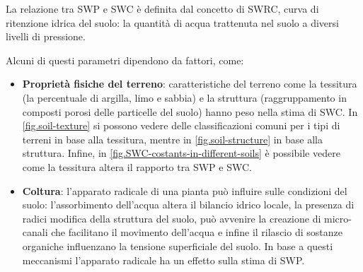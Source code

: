 \documentclass[12pt,a4paper,openright,twoside, openany]{book}
\begin{document}
La relazione tra \ac{SWP} e \ac{SWC} è definita dal concetto di \ac{SWRC}, curva di ritenzione idrica del suolo: la quantità di acqua trattenuta nel suolo a diversi livelli di pressione\cite{assouline1998water}.

Alcuni di questi parametri dipendono da fattori, come:
\begin{itemize}[noitemsep]
    \item \textbf{Proprietà fisiche del terreno}: caratteristiche del terreno come la tessitura (la percentuale di argilla, limo e sabbia) e la struttura (raggruppamento in composti porosi delle particelle del suolo) hanno peso nella stima di \ac{SWC}. In \cref{fig.soil-texture} si possono vedere delle classificazioni comuni per i tipi di terreni in base alla tessitura, mentre in \cref{fig.soil-structure} in base alla struttura. Infine, in \cref{fig.SWC-costants-in-different-soils} è possibile vedere come la tessitura altera il rapporto tra \ac{SWP} e \ac{SWC}.
    \newpage
    \item \textbf{Coltura}: l'apparato radicale di una pianta può influire sulle condizioni del suolo: l'assorbimento dell'acqua altera il bilancio idrico locale, la presenza di radici modifica della struttura del suolo, può avvenire la creazione di micro-canali che facilitano il movimento dell'acqua e infine il rilascio di sostanze organiche influenzano la tensione superficiale del suolo. In base a questi meccanismi l'apparato radicale ha un effetto sulla stima di \ac{SWP}\cite{XIAO2024167524}.
\end{itemize}
\end{document}
